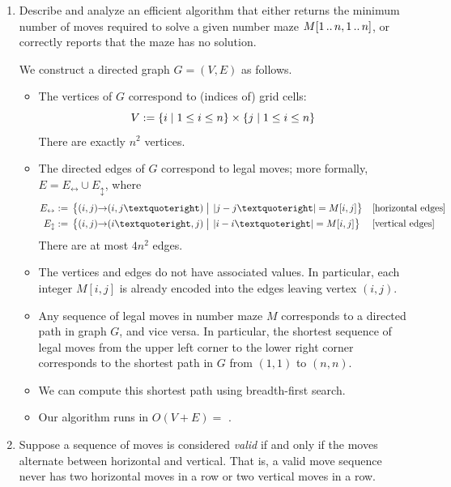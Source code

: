 \documentclass[11pt]{article}
\begin{document}
\begin{enumerate}
\parindent 1.5em \itemsep 2ex

\item
Describe and analyze an efficient algorithm that either returns the minimum number of moves required to solve a given number maze $M[1\,..\,n, 1\,..\,n]$, or correctly reports that the maze has no solution.

\begin{Solution}
We construct a directed graph $G=(V,E)$ as follows.
\begin{itemize}
\item
The vertices of $G$ correspond to (indices of) grid cells:
\[
	V := \{ i\mid 1\le i\le n \} \times \{ j\mid 1\le i\le n \}
\]
There are exactly $n^2$ vertices.

\item
The directed edges of $G$ correspond to legal moves; more formally, $E = E_\leftrightarrow \cup E_\updownarrow$, where
\begin{align*}
	E_\leftrightarrow := {}&
		\Setbar{(i,j)\arcto(i,j’)\strut}{\abs{j-j’} = M[i,j]}
				&& \text{[horizontal edges]} \\
	E_\updownarrow := {}&
		 \Setbar{(i,j)\arcto(i’,j)\strut}{\abs{i-i’} = M[i,j]}
				&& \text{[vertical edges]}
\end{align*}
There are at most $4n^2$ edges.

\item
The vertices and edges do not have associated values.  In particular, each integer $M[i,j]$ is already encoded into the edges leaving vertex $(i,j)$.

\item
Any sequence of legal moves in number maze $M$ corresponds to a directed path in graph $G$, and vice versa.  In particular, the shortest sequence of legal moves from the upper left corner to the lower right corner corresponds to the shortest path in $G$ from $(1,1)$ to $(n,n)$.

\item
We can compute this shortest path using breadth-first search.

\item
Our algorithm runs in $O(V+E) =$ .

\end{itemize}
\end{Solution}


\newpage
\item
Suppose a sequence of moves is considered \emph{valid} if and only if the moves  alternate between horizontal and vertical.  That is, a valid move sequence never has two horizontal moves in a row or two vertical moves in a row.


\end{enumerate}
\end{document}
